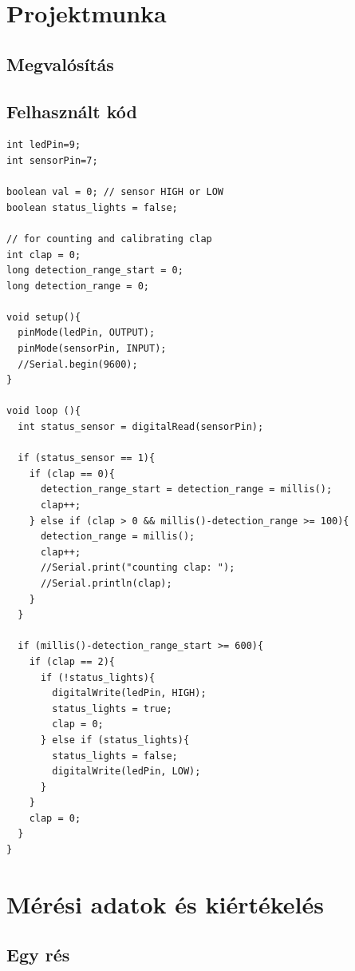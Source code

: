 \documentclass[a4paper,11pt]{article}
\begin{document}
\section{Projektmunka}

\subsection{Megvalósítás}




\subsection{Felhasznált kód}

\begin{lstlisting}
int ledPin=9;
int sensorPin=7;

boolean val = 0; // sensor HIGH or LOW
boolean status_lights = false;

// for counting and calibrating clap
int clap = 0;
long detection_range_start = 0;
long detection_range = 0;

void setup(){
  pinMode(ledPin, OUTPUT);
  pinMode(sensorPin, INPUT);
  //Serial.begin(9600);
}
  
void loop (){
  int status_sensor = digitalRead(sensorPin);
  
  if (status_sensor == 1){
    if (clap == 0){
      detection_range_start = detection_range = millis();
      clap++; 
    } else if (clap > 0 && millis()-detection_range >= 100){
      detection_range = millis();
      clap++;
      //Serial.print("counting clap: ");
      //Serial.println(clap);
    }
  }
  
  if (millis()-detection_range_start >= 600){
    if (clap == 2){ 
      if (!status_lights){
        digitalWrite(ledPin, HIGH);
        status_lights = true;
        clap = 0;
      } else if (status_lights){
        status_lights = false;
        digitalWrite(ledPin, LOW);
      }
    }
    clap = 0;
  }
}
\end{lstlisting} 

\section{Mérési adatok és kiértékelés}

\subsection{Egy rés}
\end{document}
